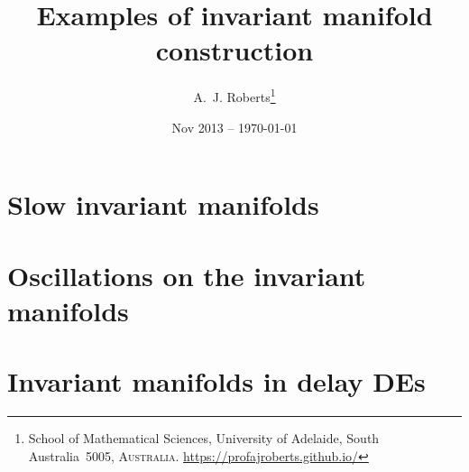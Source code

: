 \documentclass[11pt,a4paper]{refart}
\title{Examples of invariant manifold construction}
\author{A.~J. Roberts\thanks{School of Mathematical Sciences, University of Adelaide, South Australia~5005, \textsc{Australia}.
\url{https://profajroberts.github.io/}}}
\date{Nov 2013 -- \today}
\begin{document}
\maketitle

\tableofcontents



\section{Slow invariant manifolds}






\section{Oscillations on the invariant manifolds}







\section{Invariant manifolds in delay DEs}



\end{document}
